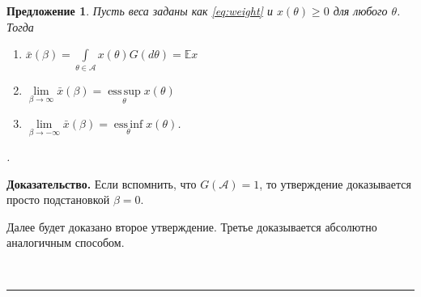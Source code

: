 \documentclass[12pt]{article}
\newtheorem{proposition}{Предложение}
\newenvironment{proof}[1][Доказательство]{\noindent\textbf{#1.} }{\ \rule{0.5em}{0.5em}}
\DeclareMathOperator*{\esssup}{ess\,sup}
\DeclareMathOperator*{\essinf}{ess\,inf}
\begin{document}
\begin{proposition}
Пусть веса заданы как \eqref{eq:weight} и $x(\theta) \geq 0$ для любого $\theta$.  Тогда 
\begin{enumerate}
\item $\bar{x}(\beta) = \int\limits_{\theta \in \mathcal{A}}x(\theta)G(d \theta) = \mathbb{E} x$
\item $\lim\limits_{\beta \to\infty} \bar{x}(\beta) = \esssup\limits_{\theta} x(\theta)$
\item $\lim\limits_{\beta \to-\infty} \bar{x}(\beta) = \essinf\limits_{\theta} x(\theta)$.
\end{enumerate}.
\end{proposition}
\begin{proof}
Если вспомнить, что $G(\mathcal{A}) = 1$, то утверждение доказывается просто подстановкой $\beta = 0$.

Далее будет доказано второе утверждение.  Третье доказывается абсолютно аналогичным способом.


\end{proof}
\end{document}

